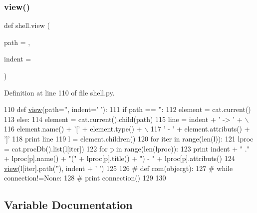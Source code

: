 \subsubsection{\texorpdfstring{view()}{view()}}
{\footnotesize\ttfamily def shell.\+view (\begin{DoxyParamCaption}\item[{}]{path = {\ttfamily \textquotesingle{}\textquotesingle{}},  }\item[{}]{indent = {\ttfamily \textquotesingle{}~~\textquotesingle{}} }\end{DoxyParamCaption})}



Definition at line 110 of file shell.\+py.


\begin{DoxyCode}
110 \textcolor{keyword}{def }\hyperlink{namespaceshell_aebe5a080b6d651f77ca73d69a425f126}{view}(path='', indent='  '):
111   \textcolor{keywordflow}{if} path == \textcolor{stringliteral}{''}:
112     element = cat.current()
113   \textcolor{keywordflow}{else}:
114     element = cat.current().child(path)
115   line = indent + \textcolor{stringliteral}{' -> '} + \(\backslash\)
116       element.name() + \textcolor{stringliteral}{'['} + element.type() + \(\backslash\)
117       \textcolor{stringliteral}{' - '} + element.attributs() + \textcolor{stringliteral}{']'}
118   \textcolor{keywordflow}{print} line
119   l = element.children()
120   \textcolor{keywordflow}{for} iter \textcolor{keywordflow}{in} range(len(l)):
121     lproc = cat.procDb().list(l[iter])
122     \textcolor{keywordflow}{for} p \textcolor{keywordflow}{in} range(len(lproc)):
123       \textcolor{keywordflow}{print} indent + \textcolor{stringliteral}{"   ."} + lproc[p].name() + \textcolor{stringliteral}{"("} + lproc[p].title() + \textcolor{stringliteral}{") - "} + lproc[p].attributs()
124     \hyperlink{namespaceshell_aebe5a080b6d651f77ca73d69a425f126}{view}(l[iter].path(\textcolor{stringliteral}{''}), indent + \textcolor{stringliteral}{'  '})
125 
126  \textcolor{comment}{# def com(objecgt):}
127  \textcolor{comment}{#   while connection!=None:}
128  \textcolor{comment}{#   print connection()}
129 
130 
\end{DoxyCode}


\subsection{Variable Documentation}
\mbox{\label{namespaceshell_aa87f3fd6ea8190070b0b7326abebf39c}} 
